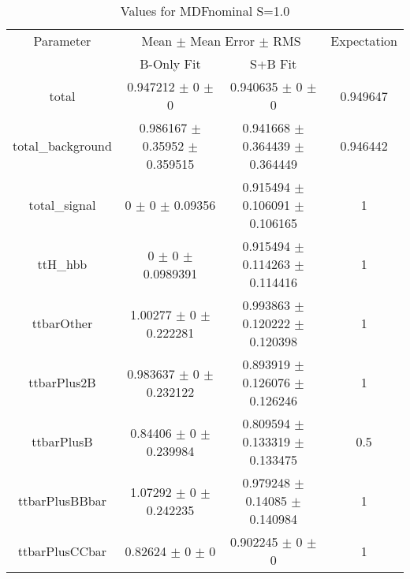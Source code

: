 \begin{table}
\centering
\caption{Values for MDFnominal S=1.0}
\begin{tabular}{cccc}
\toprule
Parameter & \multicolumn{2}{c}{Mean $\pm$ Mean Error $\pm$ RMS} & Expectation\\
 & B-Only Fit & S+B Fit & \\
\midrule
total & \num{0.947212} $\pm$ \num{0} $\pm$ \num{0} & \num{0.940635} $\pm$ \num{0} $\pm$ \num{0} & \num{0.949647}\\
total\_background & \num{0.986167} $\pm$ \num{0.35952} $\pm$ \num{0.359515} & \num{0.941668} $\pm$ \num{0.364439} $\pm$ \num{0.364449} & \num{0.946442}\\
total\_signal & \num{0} $\pm$ \num{0} $\pm$ \num{0.09356} & \num{0.915494} $\pm$ \num{0.106091} $\pm$ \num{0.106165} & \num{1}\\
ttH\_hbb & \num{0} $\pm$ \num{0} $\pm$ \num{0.0989391} & \num{0.915494} $\pm$ \num{0.114263} $\pm$ \num{0.114416} & \num{1}\\
ttbarOther & \num{1.00277} $\pm$ \num{0} $\pm$ \num{0.222281} & \num{0.993863} $\pm$ \num{0.120222} $\pm$ \num{0.120398} & \num{1}\\
ttbarPlus2B & \num{0.983637} $\pm$ \num{0} $\pm$ \num{0.232122} & \num{0.893919} $\pm$ \num{0.126076} $\pm$ \num{0.126246} & \num{1}\\
ttbarPlusB & \num{0.84406} $\pm$ \num{0} $\pm$ \num{0.239984} & \num{0.809594} $\pm$ \num{0.133319} $\pm$ \num{0.133475} & \num{0.5}\\
ttbarPlusBBbar & \num{1.07292} $\pm$ \num{0} $\pm$ \num{0.242235} & \num{0.979248} $\pm$ \num{0.14085} $\pm$ \num{0.140984} & \num{1}\\
ttbarPlusCCbar & \num{0.82624} $\pm$ \num{0} $\pm$ \num{0} & \num{0.902245} $\pm$ \num{0} $\pm$ \num{0} & \num{1}\\
\bottomrule
\end{tabular}
\end{table}